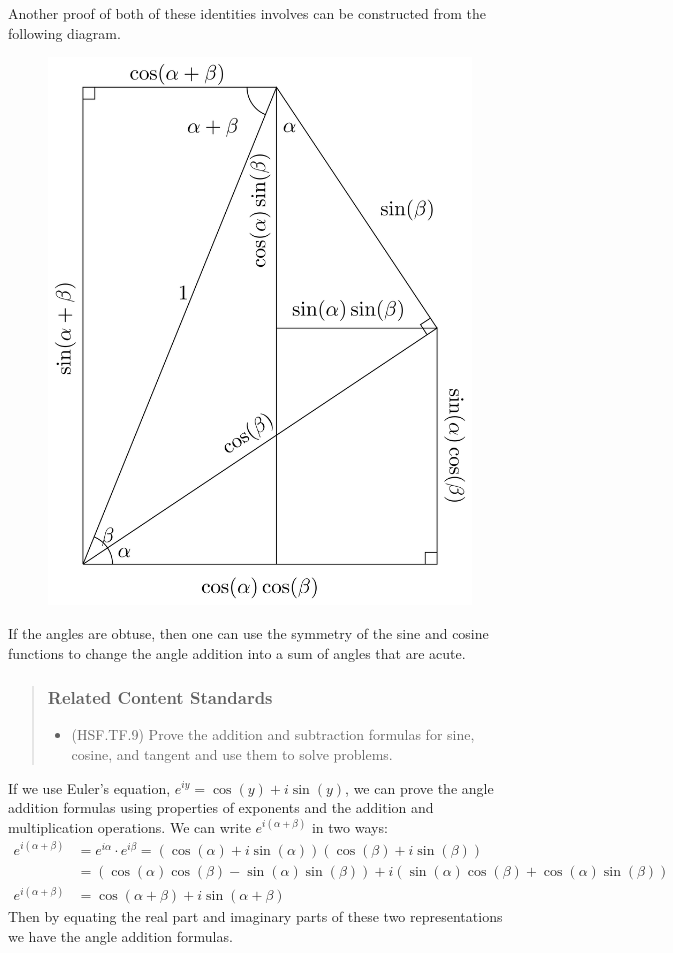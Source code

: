 \documentclass[
]{book}
\providecommand{\tightlist}{%
  \setlength{\itemsep}{0pt}\setlength{\parskip}{0pt}}
\theoremstyle{definition}
\theoremstyle{definition}
\theoremstyle{definition}
\theoremstyle{remark}
\begin{document}
Another proof of both of these identities involves can be constructed from the following diagram.

\begin{figure}

{\centering \includegraphics[width=0.6\linewidth]{tikz/angle-addition-sine3} 

}

\end{figure}

If the angles are obtuse, then one can use the symmetry of the sine and cosine functions to change the angle addition into a sum of angles that are acute.

\begin{quote}
\hypertarget{related-content-standards-58}{%
\subsubsection*{Related Content Standards}\label{related-content-standards-58}}

\begin{itemize}
\tightlist
\item
  (HSF.TF.9) Prove the addition and subtraction formulas for sine, cosine, and tangent and use them to solve problems.
\end{itemize}
\end{quote}

If we use Euler's equation, \(e^{iy} = \cos(y) + i \sin(y)\), we can prove the angle addition formulas using properties of exponents and the addition and multiplication operations. We can write \(e^{i(\alpha+\beta)}\) in two ways:
\begin{align*}
e^{i(\alpha+\beta)} &= e^{i\alpha} \cdot e^{i\beta} = (\cos(\alpha) + i \sin(\alpha) ) (\cos(\beta) + i \sin(\beta))\\
&= \left( \cos(\alpha)\cos(\beta)-\sin(\alpha)\sin(\beta)\right) + i \left( \sin(\alpha)\cos(\beta) + \cos(\alpha)\sin(\beta)\right) \\
e^{i(\alpha+\beta)} &= \cos(\alpha+\beta) + i \sin(\alpha+\beta)
\end{align*}
Then by equating the real part and imaginary parts of these two representations we have the angle addition formulas.
\end{document}

